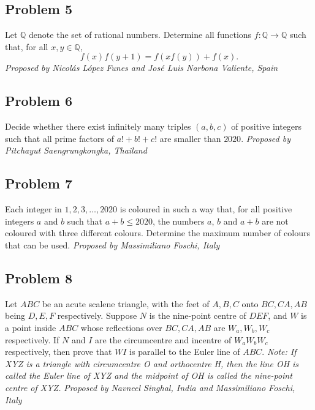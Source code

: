 \subsection*{Problem 5}
Let $\mathbb{Q}$ denote the set of rational numbers. Determine all functions $f:
\mathbb{Q}\rightarrow\mathbb{Q}$ such that, for all $x,y \in\mathbb{Q}$,
\[f(x)f(y+1) = f(xf(y))+f(x).\]
\textit{Proposed by Nicolás López Funes and José Luis Narbona Valiente, Spain}
\subsection*{Problem 6}
Decide whether there exist infinitely many triples $(a,b,c)$ of positive integers such that all prime factors of $a!+b!+c!$ are smaller than $2020$.
\nl
\textit{Proposed by Pitchayut Saengrungkongka, Thailand}
\subsection*{Problem 7}
Each integer in ${1, 2, 3, \ldots, 2020}$ is coloured in such a way that, for all positive integers $a$ and $b$ such that $a+b \leq 2020$, the numbers $a$, $b$ and $a+b$ are not coloured with three different colours. Determine the maximum number of colours that can be used. \nl
\textit{Proposed by Massimiliano Foschi, Italy}
\subsection*{Problem 8}
Let $ABC$ be an acute scalene triangle, with the feet of $A, B, C$ onto $BC, CA, AB$ being $D, E, F$ respectively. Suppose $N$ is the nine-point centre of $DEF$, and $W$ is a point inside $ABC$ whose reflections over $BC, CA, AB$ are $W_a, W_b, W_c$ respectively. If $N$ and $I$ are the circumcentre and incentre of $W_aW_bW_c$ respectively, then prove that $WI$ is parallel to the Euler line of $ABC$.\nl
\emph{Note: If XYZ is a triangle with circumcentre O and orthocentre H, then the line OH is called the Euler line of XYZ and the midpoint of OH is called the nine-point centre of XYZ.}\nl
\textit{Proposed by Navneel Singhal, India and Massimiliano Foschi, Italy}
